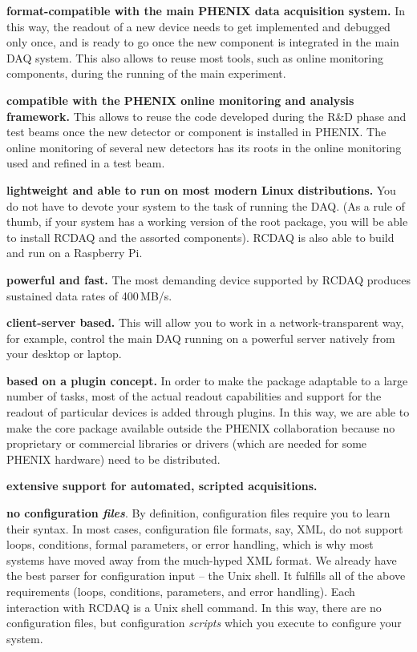 \documentclass{article}[11pt]
\begin{document}
\begin{description}

\item {\bf format-compatible with the main PHENIX data acquisition
  system.} In this way, the readout of a new device needs to get
  implemented and debugged only once, and is ready to go once the new
  component is integrated in the main DAQ system. This also allows to
  reuse most tools, such as online monitoring components, during the
  running of the main experiment.

\item {\bf compatible with the PHENIX online monitoring and analysis
  framework.}  This allows to reuse the code developed during the R\&D
  phase and test beams once the new detector or component is installed
  in PHENIX. The online monitoring of several new detectors has its
  roots in the online monitoring used and refined in a test beam.

\item {\bf lightweight and able to run on most modern Linux distributions.}
  You do not have to devote your system to the task of running the
  DAQ. (As a rule of thumb, if your system has a working version of the 
  root package, you will be able to install RCDAQ and the assorted
  components). RCDAQ is also able to build and run on a Raspberry Pi.

\item {\bf powerful and fast.} The most demanding device supported by
  RCDAQ produces sustained data rates of 400\,MB/s.

\item {\bf client-server based.} This will allow you to work in a
  network-transparent way, for example, control the main DAQ running on
  a powerful server natively from your desktop or laptop.

\item {\bf based on a plugin concept.} In order to make the package
  adaptable to a large number of tasks, most of the actual readout
  capabilities and support for the readout of particular devices is
  added through plugins. In this way, we are able to make the core
  package available outside the PHENIX collaboration because no
  proprietary or commercial libraries or drivers (which are needed for
  some PHENIX hardware) need to be distributed.

\item {\bf extensive support for automated, scripted acquisitions.}

\item {\bf no configuration \emph{files}}. By definition,
  configuration files require you to learn their syntax. In most
  cases, configuration file formats, say, XML, do not support loops,
  conditions, formal parameters, or error handling, which is why most
  systems have moved away from the much-hyped XML format. We already
  have the best parser for configuration input -- the Unix shell. It
  fulfills all of the above requirements (loops, conditions, parameters,
  and error handling). Each interaction with RCDAQ is a Unix shell
  command. In this way, there are no configuration files, but
  configuration \emph{scripts} which you execute to configure your
  system.


\end{description}
\end{document}
